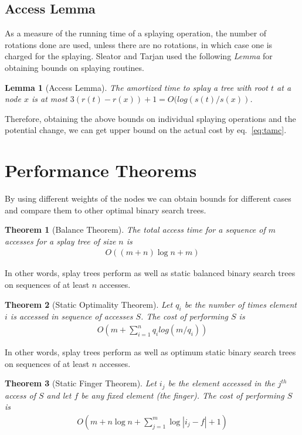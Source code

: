 \documentclass{article}
\newtheorem{thm}{Theorem}
\newtheorem{lem}{Lemma}
\begin{document}
\subsection{Access Lemma}
As a measure of the running time of a splaying operation, the number of rotations done are used, unless there are no rotations, in which case one is charged for the splaying. Sleator and Tarjan used the following \emph{Lemma} for obtaining bounds on splaying routines.
\begin{lem}[Access Lemma]
\label{lem:acl}
The amortized time to splay a tree with root $t$ at a node $x$ is at most $3( r(t)- r(x))+ 1 = O(log(s(
 t)/s(x))$.
\end{lem}
Therefore, obtaining the above bounds on individual splaying operations and the potential change, we can get upper bound on the actual cost by eq.~\ref{eq:tamc}.
\section{Performance Theorems}
By using different weights of the nodes we can obtain bounds for different cases and compare them to other optimal binary search trees.
\begin{thm}[Balance Theorem]
\label{thm:bal}
The total access time for a sequence of $m$ accesses for a splay tree of size $n$ is 
\begin{align}
O((m + n)\log n + m)
\end{align}
\end{thm}
In other words, splay trees perform as well as static balanced binary search trees on sequences of at least $n$ accesses.
\begin{thm}[Static Optimality Theorem]
\label{thm:statop}
Let $q_i$ be the number of times element $i$ is accessed in sequence of accesses $S$. The cost of performing $S$ is 
\begin{align}
O(m+ \sum_{i=1}^n q_i log(m/q_i))
\end{align}
\end{thm}
In other words, splay trees perform as well as optimum static binary search trees on sequences of at least $n$ accesses.
\begin{thm}[Static Finger Theorem]
\label{thm:statfin}
Let $i_j$ be the element accessed in the $j^{th}$ access of $S$ and let $f$ be any fixed element (\emph{the finger}). The cost of performing $S$ is 
\begin{align}
O(m+ n\log n + \sum_{j=1}^m {\log |i_j - f| + 1})
\end{align}
\end{thm}
\end{document}
